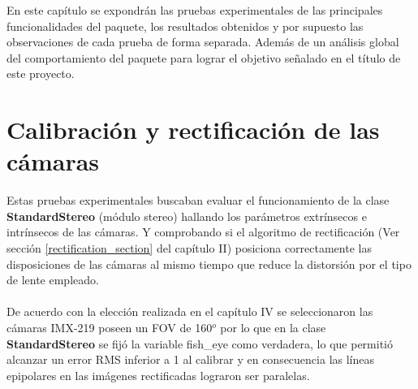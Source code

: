En este capítulo se expondrán las pruebas experimentales de las principales funcionalidades del paquete, los resultados obtenidos y por supuesto las observaciones de cada prueba de forma separada. Además de un análisis global del comportamiento del paquete para lograr el objetivo señalado en el título de este proyecto.
\section{Calibración y rectificación de las cámaras}
Estas pruebas experimentales buscaban evaluar el funcionamiento de la clase \textbf{StandardStereo} (módulo stereo) hallando los parámetros extrínsecos e intrínsecos de las cámaras. Y comprobando si el algoritmo de rectificación (Ver sección \ref{rectification_section} del capítulo II) posiciona correctamente las disposiciones de las cámaras al mismo tiempo que reduce la distorsión por el tipo de lente empleado.
\\
\\
De acuerdo con la elección realizada en el capítulo IV se seleccionaron las cámaras IMX-219 poseen un FOV de 160$^o$ por lo que en la clase \textbf{StandardStereo} se fijó la variable fish\_eye como verdadera, lo que permitió alcanzar un error RMS inferior a 1 al calibrar y en consecuencia las líneas epipolares en las imágenes rectificadas lograron ser paralelas.
